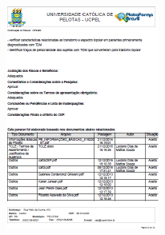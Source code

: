 \documentclass[chapter=TITLE,
               oneside,
               12pt,
               a4paper,
               english,
               brazil]{abntex2}    %
\begin{document}
\begin{anexosenv}
        \begin{center}
        \includegraphics[width=.9\textwidth]{img/cartacep02.pdf}
        \end{center}


\end{anexosenv}
\end{document}

